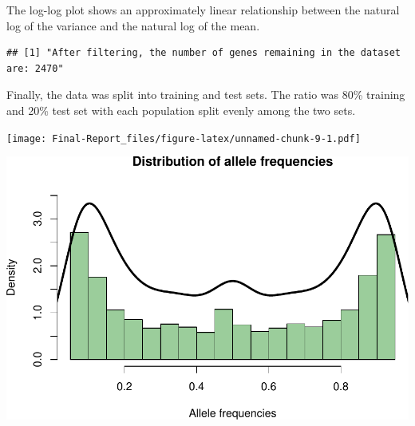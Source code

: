 \documentclass[
]{article}
\newenvironment{Shaded}{\begin{snugshade}}{\end{snugshade}}
\newcommand{\AttributeTok}[1]{\textcolor[rgb]{0.13,0.29,0.53}{#1}}
\newcommand{\CommentTok}[1]{\textcolor[rgb]{0.56,0.35,0.01}{\textit{#1}}}
\newcommand{\ConstantTok}[1]{\textcolor[rgb]{0.56,0.35,0.01}{#1}}
\newcommand{\DecValTok}[1]{\textcolor[rgb]{0.00,0.00,0.81}{#1}}
\newcommand{\FloatTok}[1]{\textcolor[rgb]{0.00,0.00,0.81}{#1}}
\newcommand{\FunctionTok}[1]{\textcolor[rgb]{0.13,0.29,0.53}{\textbf{#1}}}
\newcommand{\NormalTok}[1]{#1}
\newcommand{\OtherTok}[1]{\textcolor[rgb]{0.56,0.35,0.01}{#1}}
\newcommand{\SpecialCharTok}[1]{\textcolor[rgb]{0.81,0.36,0.00}{\textbf{#1}}}
\newcommand{\StringTok}[1]{\textcolor[rgb]{0.31,0.60,0.02}{#1}}
\begin{document}
The log-log plot shows an approximately linear relationship between the
natural log of the variance and the natural log of the mean.

\begin{verbatim}
## [1] "After filtering, the number of genes remaining in the dataset are: 2470"
\end{verbatim}

Finally, the data was split into training and test sets. The ratio was
80\% training and 20\% test set with each population split evenly among
the two sets.

\texttt{[image: Final-Report\_files/figure-latex/unnamed-chunk-9-1.pdf]}

\begin{Shaded}
\end{Shaded}

\includegraphics{Final-Report_files/figure-latex/unnamed-chunk-10-1.pdf}
\end{document}
